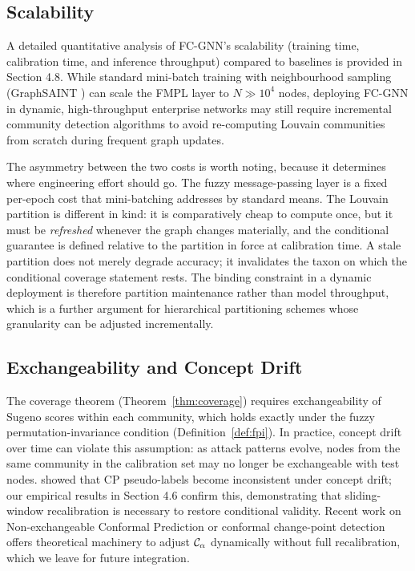 \subsection{Scalability}

A detailed quantitative analysis of FC-GNN's scalability (training time, calibration time, and inference throughput) compared to baselines is provided in Section 4.8. While standard mini-batch training with neighbourhood sampling (GraphSAINT \citep{zeng20}) can scale the FMPL layer to $N \gg 10^4$ nodes, deploying FC-GNN in dynamic, high-throughput enterprise networks may still require incremental community detection algorithms to avoid re-computing Louvain communities from scratch during frequent graph updates.

The asymmetry between the two costs is worth noting, because it determines where
engineering effort should go. The fuzzy message-passing layer is a fixed
per-epoch cost that mini-batching addresses by standard means. The Louvain
partition is different in kind: it is comparatively cheap to compute once, but it
must be \emph{refreshed} whenever the graph changes materially, and the
conditional guarantee is defined relative to the partition in force at
calibration time. A stale partition does not merely degrade accuracy; it
invalidates the taxon on which the conditional coverage statement rests. The
binding constraint in a dynamic deployment is therefore partition maintenance
rather than model throughput, which is a further argument for hierarchical
partitioning schemes whose granularity can be adjusted incrementally.

\subsection{Exchangeability and Concept Drift}

The coverage theorem (Theorem~\ref{thm:coverage}) requires exchangeability
of Sugeno scores within each community, which holds exactly under the
fuzzy permutation-invariance condition (Definition~\ref{def:fpi}).
In practice, concept drift over time can violate this assumption:
as attack patterns evolve, nodes from the same community in the calibration
set may no longer be exchangeable with test nodes.
\citet{cp_drift} showed that CP pseudo-labels become inconsistent under
concept drift; our empirical results in Section 4.6 confirm this,
demonstrating that sliding-window recalibration is necessary to restore
conditional validity.
Recent work on Non-exchangeable Conformal Prediction \citep{ncpnet25} or
conformal change-point detection \citep{cpp_coad} offers theoretical
machinery to adjust $\mathcal{C}_\alpha$ dynamically without full recalibration,
which we leave for future integration.

